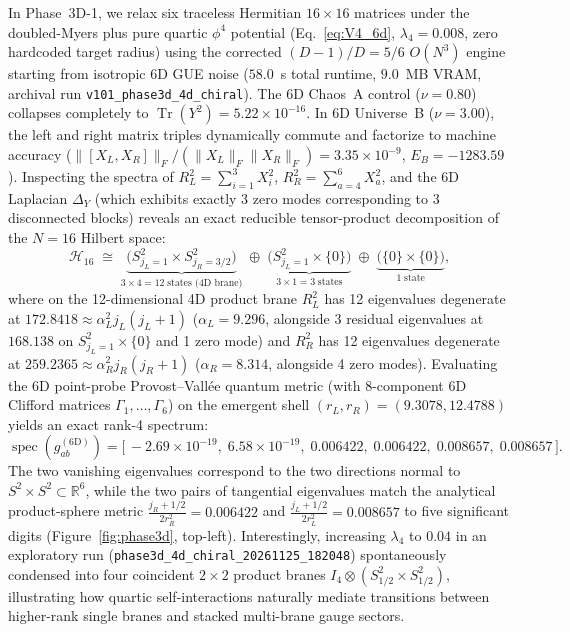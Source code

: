 \documentclass[11pt,a4paper]{article}
\DeclareMathOperator{\Tr}{Tr}
\DeclareMathOperator{\spec}{spec}
\begin{document}
In Phase~3D-1, we relax six traceless Hermitian $16\times 16$ matrices under the doubled-Myers plus pure quartic $\phi^4$ potential (Eq.~\eqref{eq:V4_6d}, $\lambda_4 = 0.008$, zero hardcoded target radius) using the corrected $(D-1)/D = 5/6$ $O(N^3)$ engine starting from isotropic 6D GUE noise ($58.0$~s total runtime, $9.0$~MB VRAM, archival run \texttt{v101\_phase3d\_4d\_chiral}). The 6D Chaos~A control ($\nu=0.80$) collapses completely to $\Tr(Y^2) = 5.22\times 10^{-16}$. In 6D Universe~B ($\nu=3.00$), the left and right matrix triples dynamically commute and factorize to machine accuracy ($\|[X_L, X_R]\|_F / (\|X_L\|_F \|X_R\|_F) = 3.35\times 10^{-9}$, $E_B = -1283.59$). Inspecting the spectra of $R_L^2 = \sum_{i=1}^3 X_i^2$, $R_R^2 = \sum_{a=4}^6 X_a^2$, and the 6D Laplacian $\Delta_Y$ (which exhibits exactly 3 zero modes corresponding to 3 disconnected blocks) reveals an exact reducible tensor-product decomposition of the $N=16$ Hilbert space:
\begin{equation}
  \mathcal{H}_{16} \;\cong\; \underbrace{\bigl(S^2_{j_L=1} \times S^2_{j_R=3/2}\bigr)}_{3\times 4 = 12\;\text{states (4D brane)}}
  \;\oplus\; \underbrace{\bigl(S^2_{j_L=1} \times \{0\}\bigr)}_{3\times 1 = 3\;\text{states}}
  \;\oplus\; \underbrace{\bigl(\{0\}\times\{0\}\bigr)}_{1\;\text{state}},
  \label{eq:decomp_16}
\end{equation}
where on the 12-dimensional 4D product brane $R_L^2$ has 12 eigenvalues degenerate at $172.8418 \approx \alpha_L^2 j_L(j_L+1)$ ($\alpha_L = 9.296$, alongside 3 residual eigenvalues at $168.138$ on $S^2_{j_L=1}\times\{0\}$ and 1 zero mode) and $R_R^2$ has 12 eigenvalues degenerate at $259.2365 \approx \alpha_R^2 j_R(j_R+1)$ ($\alpha_R = 8.314$, alongside 4 zero modes). Evaluating the 6D point-probe Provost--Vall\'ee quantum metric (with 8-component 6D Clifford matrices $\Gamma_1,\dots,\Gamma_6$) on the emergent shell $(r_L, r_R) = (9.3078, 12.4788)$ yields an exact rank-4 spectrum:
\begin{equation}
  \spec(g_{ab}^{(6\mathrm{D})}) = \bigl[\,-2.69\times 10^{-19},\; 6.58\times 10^{-19},\; 0.006422,\; 0.006422,\; 0.008657,\; 0.008657\,\bigr].
\end{equation}
The two vanishing eigenvalues correspond to the two directions normal to $S^2\times S^2 \subset \mathbb{R}^6$, while the two pairs of tangential eigenvalues match the analytical product-sphere metric $\frac{j_R+1/2}{2r_R^2} = 0.006422$ and $\frac{j_L+1/2}{2r_L^2} = 0.008657$ to five significant digits (Figure~\ref{fig:phase3d}, top-left). Interestingly, increasing $\lambda_4$ to $0.04$ in an exploratory run (\texttt{phase3d\_4d\_chiral\_20261125\_182048}) spontaneously condensed into four coincident $2\times 2$ product branes $I_4 \otimes (S^2_{1/2}\times S^2_{1/2})$, illustrating how quartic self-interactions naturally mediate transitions between higher-rank single branes and stacked multi-brane gauge sectors.
\end{document}
